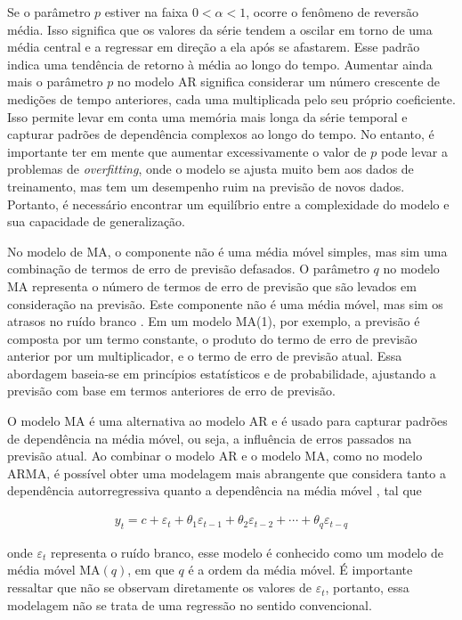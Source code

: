  Se o parâmetro $p$ estiver na faixa $0 < \alpha < 1$, ocorre o fenômeno de reversão média. Isso significa que os valores da série tendem a oscilar em torno de uma média central e a regressar em direção a ela após se afastarem. Esse padrão indica uma tendência de retorno à média ao longo do tempo. Aumentar ainda mais o parâmetro $p$ no modelo AR significa considerar um número crescente de medições de tempo anteriores, cada uma multiplicada pelo seu próprio coeficiente. Isso permite levar em conta uma memória mais longa da série temporal e capturar padrões de dependência complexos ao longo do tempo. No entanto, é importante ter em mente que aumentar excessivamente o valor de $p$ pode levar a problemas de \textit{overfitting}, onde o modelo se ajusta muito bem aos dados de treinamento, mas tem um desempenho ruim na previsão de novos dados. Portanto, é necessário encontrar um equilíbrio entre a complexidade do modelo e sua capacidade de generalização.
 
No modelo de MA, o componente não é uma média móvel simples, mas sim uma combinação de termos de erro de previsão defasados. O parâmetro $q$ no modelo MA representa o número de termos de erro de previsão que são levados em consideração na previsão. Este componente não é uma média móvel, mas sim os atrasos no ruído branco \cite{signal}.
Em um modelo MA(1), por exemplo, a previsão é composta por um termo constante, o produto do termo de erro de previsão anterior por um multiplicador, e o termo de erro de previsão atual. Essa abordagem baseia-se em princípios estatísticos e de probabilidade, ajustando a previsão com base em termos anteriores de erro de previsão.
 
O modelo MA é uma alternativa ao modelo AR e é usado para capturar padrões de dependência na média móvel, ou seja, a influência de erros passados na previsão atual. Ao combinar o modelo AR e o modelo MA, como no modelo ARMA, é possível obter uma modelagem mais abrangente que considera tanto a dependência autorregressiva quanto a dependência na média móvel \cite{arima}, tal que
  
 \begin{eqnarray}
 	y_t=c+\varepsilon_t+\theta_1 \varepsilon_{t-1}+\theta_2 \varepsilon_{t-2}+\cdots+\theta_q \varepsilon_{t-q}\label{eq:ma}
 \end{eqnarray}
 
\noindent onde $\varepsilon_t$ representa o ruído branco, esse modelo é conhecido como um modelo de média móvel MA$(q)$, em que $q$ é a ordem da média móvel. É importante ressaltar que não se observam diretamente os valores de $\varepsilon_t$, portanto, essa modelagem não se trata de uma regressão no sentido convencional.
 
